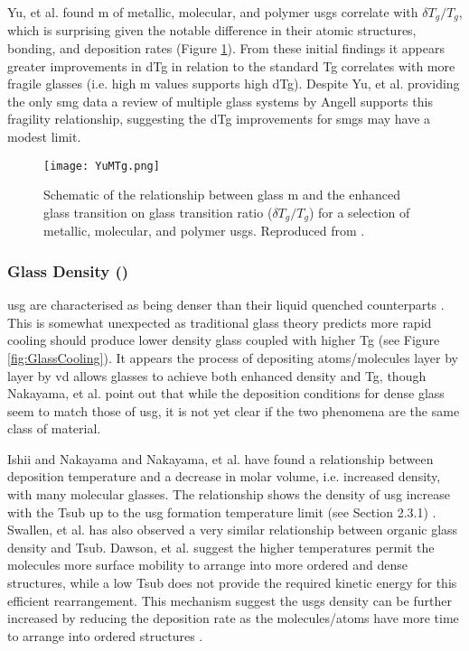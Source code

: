 \documentclass[a4paper,12pt,oneside]{report}%
\begin{document}
Yu, et al. \cite{Yu2013} found \gls{m} of metallic, molecular, and polymer \glspl{usg} correlate with $\delta T_{g}/T_{g}$, which is surprising given the notable difference in their atomic structures, bonding, and deposition rates (Figure \ref{fig:YuMTgPlot}). From these initial findings it appears greater improvements in \gls{dTg} in relation to the standard \gls{Tg} correlates with more fragile glasses (i.e. high m values supports high \gls{dTg}). Despite Yu, et al. \cite{Yu2013} providing the only \gls{smg} data a review of multiple glass systems by Angell \cite{Angell2014} supports this fragility relationship, suggesting the \gls{dTg} improvements for \glspl{smg} may have a modest limit. 

\begin{figure}[htb]
	\centering
	\texttt{[image: YuMTg.png]}
	\caption[Schematic of the relationship between glass \gls{m} and the enhanced glass transition on glass transition ratio ($\delta T_{g}/T_{g}$) for a selection of metallic, molecular, and polymer \acrshort{usg}s.]{Schematic of the relationship between glass \gls{m} and the enhanced glass transition on glass transition ratio ($\delta T_{g}/T_{g}$) for a selection of metallic, molecular, and polymer \acrshort{usg}s. Reproduced from \cite{Yu2013}.}
	\label{fig:YuMTgPlot}
\end{figure}

\subsubsection{Glass Density (\p)} 
\Gls{usg} are characterised as being denser than their liquid quenched counterparts \cite{Wang2014}. This is somewhat unexpected as traditional glass theory predicts more rapid cooling should produce lower density glass coupled with higher \gls{Tg} (see Figure \ref{fig:GlassCooling}). It appears the process of depositing atoms/molecules layer by layer by \gls{vd} allows glasses to achieve both enhanced density and \gls{Tg}, though Nakayama, et al. \cite{Nakayama2013} point out that while the deposition conditions for dense glass seem to match those of \gls{usg}, it is not yet clear if the two phenomena are the same class of material.

Ishii and Nakayama \cite{Ishii2014} and Nakayama, et al. \cite{Nakayama2013} have found a relationship between deposition temperature and a decrease in molar volume, i.e. increased density, with many molecular glasses. The relationship shows the density of \gls{usg} increase with the \gls{Tsub} up to the \gls{usg} formation temperature limit (see Section 2.3.1) \cite{Ishii2014, Nakayama2013}. Swallen, et al. \cite{Swallen2007} has also observed a very similar relationship between organic glass density and \gls{Tsub}. Dawson, et al. \cite{Dawson2010} suggest the higher temperatures permit the molecules more surface mobility to arrange into more ordered and dense structures, while a low \gls{Tsub} does not provide the required kinetic energy for this efficient rearrangement. This mechanism suggest the \glspl{usg} density can be further increased by reducing the deposition rate as the molecules/atoms have more time to arrange into ordered structures \cite{Dawson2010}.
\end{document}
